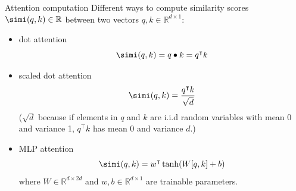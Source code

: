 \begin{frame}{Attention computation}
\vspace{-3mm}
Different ways to compute similarity scores $\simi(q, k) \in \mathbb{R}$
between two vectors $q, k \in \mathbb{R}^{d \times 1}$:
\begin{itemize}
\item dot attention 
\[
\simi(q, k) = q \bullet k = q^{\intercal} k
\]
\pause
\item scaled dot attention 
\[
\simi(q, k) = \dfrac{q^{\intercal} k}{\sqrt{d}}
\]
\pause
{\small ($\sqrt{d}$ because if elements in $q$ and $k$ are i.i.d random variables with mean 0 and variance 1, $q^{\intercal} k$ has mean 0 and variance $d$.)}
\pause
\item MLP attention 
\[
\simi(q, k) = w^{\intercal} \tanh(W [q, k] + b)
\]
where $W \in \mathbb{R}^{d \times 2d}$ and $w, b \in \mathbb{R}^{d \times 1}$ are trainable parameters.
\end{itemize}
\end{frame}

